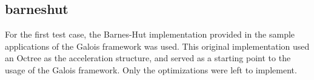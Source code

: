 \subsection{barneshut}
\label{sec:cases:barnes}

For the first test case, the Barnes-Hut implementation provided in the sample applications of the Galois framework was used.
This original implementation used an Octree as the acceleration structure, and served as a starting point to the usage of the Galois framework. Only the optimizations were left to implement.